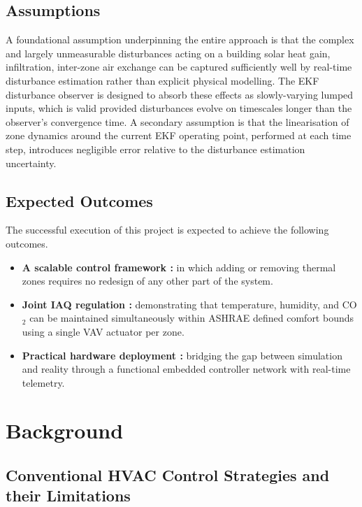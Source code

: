 \documentclass[12pt, a4paper]{article}
\begin{document}
	\subsection{Assumptions}
	
	A foundational assumption underpinning the entire approach is that the complex and largely unmeasurable disturbances acting on a building solar heat gain, infiltration, inter-zone air exchange can be captured sufficiently well by real-time disturbance estimation rather than explicit physical modelling. The EKF disturbance observer is designed to absorb these effects as slowly-varying lumped inputs, which is valid provided disturbances evolve on timescales longer than the observer's convergence time. A secondary assumption is that the linearisation of zone dynamics around the current EKF operating point, performed at each time step, introduces negligible error relative to the disturbance estimation uncertainty. 
	
	\subsection{Expected Outcomes}
	
	\noindent The successful execution of this project is expected to achieve the following outcomes.
	
	\begin{itemize}
		\item \textbf{A scalable control framework : } in which adding or removing thermal zones requires no redesign of any other part of the system.
		\item \textbf{Joint IAQ regulation :} demonstrating that temperature, humidity, and CO$_2$ can be maintained simultaneously within ASHRAE defined comfort bounds using a single VAV actuator per zone.
		\item \textbf{Practical hardware deployment :} bridging the gap between simulation and reality through a functional embedded controller network with real-time telemetry.
	\end{itemize}
	
	\newpage

	\section{Background}
	
	
	\subsection{Conventional HVAC Control Strategies and their Limitations}
	
\end{document}
